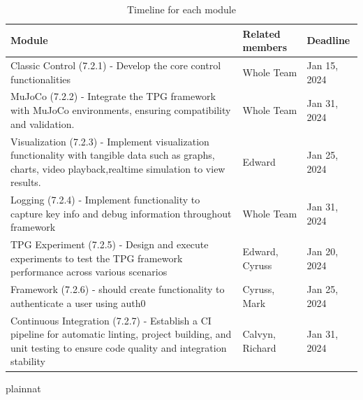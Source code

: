 \documentclass[12pt, titlepage]{article}
\begin{document}
\begin{center}
    \begin{table}
    \centering
    \begin{tabular}{p{} p{} p{}}


         \textbf{Module}&  \textbf{Related members}& \textbf{Deadline}\\ \hline 
         Classic Control (7.2.1) - Develop the core control functionalities&  Whole Team & Jan 15, 2024\\ \hline 
         MuJoCo (7.2.2) - Integrate the TPG framework with MuJoCo environments, ensuring compatibility and validation.&  Whole Team & Jan 31, 2024\\ \hline 
         Visualization (7.2.3) - Implement visualization functionality with tangible data such as 
        graphs, charts, video playback,realtime simulation to view results.
         &  Edward & Jan 25, 2024\\ \hline 
         Logging (7.2.4) - Implement functionality to capture key info and debug information throughout framework &   Whole Team & Jan 31, 2024\\ \hline 
         TPG Experiment (7.2.5) - Design and execute experiments to test the TPG framework performance across various scenarios& Edward, Cyruss & Jan 20, 2024\\ \hline 
         Framework (7.2.6) - should create functionality to authenticate a user using auth0&  Cyruss, Mark & Jan 25, 2024\\ \hline 
         Continuous Integration  (7.2.7) - Establish a CI pipeline for automatic linting, project building, and unit testing to ensure code quality and integration stability &  Calvyn, Richard& Jan 31, 2024\\ \hline 
    \end{tabular}
    \caption{Timeline for each module}
    \label{tab:my_label}
\end{table}
\end{center}

 {plainnat}


\newpage{}
\end{document}
